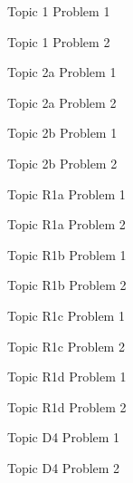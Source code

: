 \documentclass[addpoints,11pt]{exam}
\begin{document}
\gradetable[h][questions]

\newpage
\begin{questions}

\question[5] Topic 1 Problem 1

\newpage

\question[5] Topic 1 Problem 2

\newpage

\question[10] Topic 2a Problem 1

\newpage

\question[10] Topic 2a Problem 2

\newpage

\question[10] Topic 2b Problem 1

\newpage

\question[10] Topic 2b Problem 2

\newpage

\question[15] Topic R1a Problem 1

\newpage

\question[15] Topic R1a Problem 2

\newpage

\question[15] Topic R1b Problem 1

\newpage

\question[15] Topic R1b Problem 2

\newpage

\question[15] Topic R1c Problem 1

\newpage

\question[15] Topic R1c Problem 2

\newpage

\question[15] Topic R1d Problem 1

\newpage

\question[15] Topic R1d Problem 2

\newpage

\question[30] Topic D4 Problem 1

\newpage

\question[30] Topic D4 Problem 2

\newpage
\end{questions}
\end{document}
